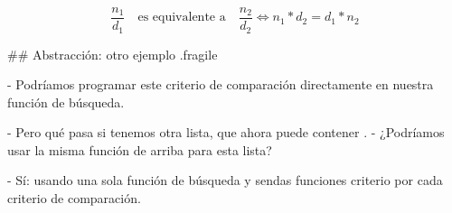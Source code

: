     $$ \frac{n_1}{d_1} \quad \text{es equivalente a} \quad \frac{n_2}{d_2} \iff n_1 * d_2 = d_1 * n_2 $$

## Abstracción: otro ejemplo {.fragile}

- Podríamos programar este criterio de comparación directamente en nuestra función de búsqueda.

\pause

- Pero qué pasa si tenemos otra lista, que ahora puede contener .
    - ¿Podríamos usar la misma función de arriba para esta lista?

\pause

- Sí: usando una sola función de búsqueda y sendas funciones criterio por cada criterio
de comparación.


